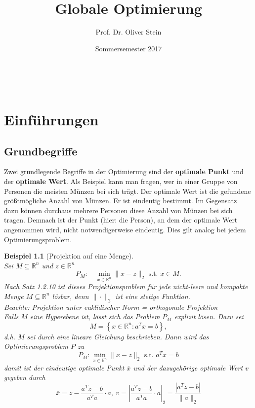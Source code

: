 \documentclass[12pt]{extreport} %
\title{Globale Optimierung}
\author{Prof. Dr. Oliver Stein}
\date{Sommersemester 2017}
\makeatletter
\newcommand{\R}{\mathbb{R}}
\theoremstyle{named}
\theoremstyle{nnamed}
\theoremstyle{itshape}
\theoremstyle{normal}
\newtheorem*{beispiel}{Beispiel}
\def\maketitle{ \begin{titlepage} 
			~\vspace{3cm} 
		\begin{center} {\Huge \@title} \end{center} 
	 		\vspace*{1cm} 
	 	\begin{center} {\large \@author} \end{center} 
	 	\vspace*{-0.5cm}
	 	\begin{center} \@date \end{center} 
	 		\vspace*{7cm} 
	 	\begin{center} \@publishers \end{center} 
	 		\vfill 
	\end{titlepage} }
\makeatother
\begin{document}
\thispagestyle{empty}

\begin{titlepage}
	\maketitle
	\thispagestyle{empty}
\end{titlepage}



\chapter{Einführungen}

\section{Grundbegriffe}

Zwei grundlegende Begriffe in der Optimierung sind der \textbf{optimale Punkt} und der \textbf{optimale Wert}. Als Beispiel kann man fragen, wer in einer Gruppe von Personen die meisten Münzen bei sich trägt. Der optimale Wert ist die gefundene größtmögliche Anzahl von Münzen. Er ist eindeutig bestimmt. Im Gegensatz dazu können durchaus mehrere Personen diese Anzahl von Münzen bei sich tragen. Demnach ist der Punkt (hier: die Person), an dem der optimale Wert angenommen wird, nicht notwendigerweise eindeutig. Dies gilt analog bei jedem Optimierungsproblem.

\begin{beispiel}[Projektion auf eine Menge] ~\\
Sei $M \subseteq \R^n$ und $z \in \R^n$
$$ P_M: \quad \min_{x \in \R^n} \| x - z \|_2 \text{ s.t. } x \in M. $$
Nach Satz 1.2.10 ist dieses Projektionsproblem für jede nicht-leere und kompakte Menge $M \subseteq \R^n$ lösbar, denn $\| \cdot \|_2$ ist eine stetige Funktion. ~\\

\textit{Beachte: Projektion unter euklidischer Norm = orthogonale Projektion} ~\\

Falls $M$ eine Hyperebene ist, lässt sich das Problem $P_M$ explizit lösen. Dazu sei 
$$ M = \left\{ x \in \R^n \colon a^T x = b \right\}, $$
d.h. $M$ sei durch eine lineare Gleichung beschrieben. Dann wird das Optimierungsproblem $P$ zu
$$ P_M\colon \min_{x \in \R^n} \| x - z \|_2 \text{ s.t. } a^Tx = b $$
damit ist der eindeutige optimale Punkt $\overline{x}$ und der dazugehörige optimale Wert $v$ gegeben durch
$$ \overline{x} = z - \frac{a^T z - b}{a^T a} \cdot a, ~ v = \left| \frac{a^T z - b}{a^T a} \cdot a \right|_2 = \frac{\left| a^T z - b \right|}{\| a \|_2}$$
\end{beispiel}
\end{document}
